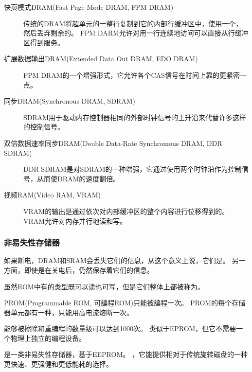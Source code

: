 {{{            \begin{description}
                \item[快页模式DRAM(Fast Page Mode DRAM, FPM DRAM)]
                {
                    传统的DRAM将超单元的一整行复制到它的内部行缓冲区中，使用一个，然后丢弃剩余的。
                    FPM DARM允许对用一行连续地访问可以直接从行缓冲区得到服务。
                }
                \item[扩展数据输出DRAM(Extended Data Out DRAM, EDO DRAM)] FPM DRAM的一个增强形式，它允许各个CAS信号在时间上靠的更紧密一点。
                \item[同步DRAM(Synchronous DRAM, SDRAM)] SDRAM用于驱动内存控制器相同的外部时钟信号的上升沿来代替许多这样的控制信号。
                \item[双倍数据速率同步DRAM(Double Data-Rate Synchromous DRAM, DDR SDRAM)] DDR SDRAM是对SDRAM的一种增强，它通过使用两个时钟沿作为控制信号，从而使DRAM的速度翻倍。
                \item[视频RAM(Video RAM, VRAM)]
                {
                    VRAM的输出是通过依次对内部缓冲区的整个内容进行位移得到的。
                    VRAM允许对内存并行地读和写。
                }
            \end{description}
        }

        \subsubsection{非易失性存储器}
        {
            如果断电，DRAM和SRAM会丢失它们的信息，从这个意义上说，它们是。
            另一方面，即使是在关电后，仍然保存着它们的信息。

            虽然ROM中有的类型既可以读也可写，但是它们整体上都被称为。

            PROM(Programmable ROM, 可编程ROM)只能被编程一次。
            PROM的每个存储器单元都有一种，只能用高电流熔断一次。

            能够被擦除和重编程的数量级可以达到1000次。
            类似于EPROM，但它不需要一个物理上独立的编程设备。

            是一类非易失性存储器，基于EEPROM。
            ，它能提供相对于传统旋转磁盘的一种更快速、更强健和更低能耗的选择。

}}}

